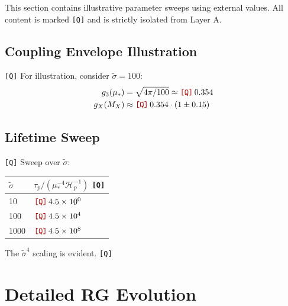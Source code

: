 \documentclass[11pt,a4paper]{article}
\newcommand{\Qnum}[1]{\textcolor{red!70!black}{\texttt{[Q]}}\,#1}
\newcommand{\tagQ}{\textcolor{red!70!black}{\texttt{[Q]}}}
\theoremstyle{definition}
\begin{document}

\begin{quarantinebox}
This section contains illustrative parameter sweeps using external values.
All content is marked \tagQ{} and is strictly isolated from Layer A.
\end{quarantinebox}

\subsection{Coupling Envelope Illustration}
\label{subsec:coupling-envelope}

\tagQ{} For illustration, consider $\tilde{\sigma} = 100$:
\begin{align}
\label{eq:qnum-g3}
g_3(\mu_*) &= \sqrt{4\pi/100} \approx \Qnum{0.354} \\
\label{eq:qnum-gx}
g_X(M_X) &\approx \Qnum{0.354} \cdot (1 \pm 0.15)
\end{align}

\subsection{Lifetime Sweep}
\label{subsec:lifetime-sweep}

\tagQ{} Sweep over $\tilde{\sigma}$:
\begin{center}
\begin{tabular}{ll}
\toprule
$\tilde{\sigma}$ & $\tau_p / (\mu_*^{-4} \mathcal{H}_p^{-1})$ \tagQ{} \\
\midrule
10 & $\Qnum{4.5 \times 10^{0}}$ \\
100 & $\Qnum{4.5 \times 10^{4}}$ \\
1000 & $\Qnum{4.5 \times 10^{8}}$ \\
\bottomrule
\end{tabular}
\end{center}

The $\tilde{\sigma}^4$ scaling is evident. \tagQ{}


\appendix

\section{Detailed RG Evolution}
\label{app:rg-evolution}
\end{document}
